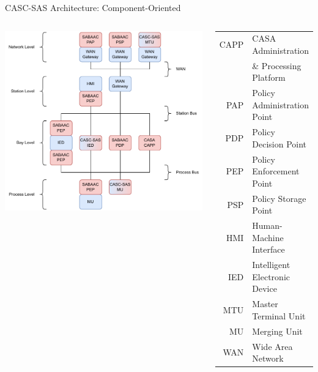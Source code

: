 \documentclass[en]{sdqbeamer}
\begin{document}
\begin{frame}{CASC-SAS Architecture: Component-Oriented}
    \begin{columns}
        \centering
        \includegraphics[height=0.75\textheight]{./figures/casc_architecture_color.drawio.pdf}
        \footnotesize
        \begin{center}
            \begin{tabular}{r l}
                \color{IndianRed} CAPP & \color{IndianRed} CASA Administration \\
                     & \color{IndianRed} \& Processing Platform \\
                \color{IndianRed} PAP & \color{IndianRed} Policy Administration Point\\
                \color{IndianRed} PDP & \color{IndianRed} Policy Decision Point \\
                \color{IndianRed} PEP & \color{IndianRed} Policy Enforcement Point\\
                \color{IndianRed} PSP & \color{IndianRed} Policy Storage Point \vspace{1em}\\
                \color{SteelBlue} HMI & \color{SteelBlue} Human-Machine Interface \\
                \color{SteelBlue} IED & \color{SteelBlue} Intelligent Electronic Device \\
                \color{SteelBlue} MTU & \color{SteelBlue} Master Terminal Unit\\
                \color{SteelBlue} MU & \color{SteelBlue} Merging Unit \\
                \color{SteelBlue} WAN & \color{SteelBlue} Wide Area Network
            \end{tabular}
        \end{center}
    \end{columns}
\end{frame}
\end{document}
